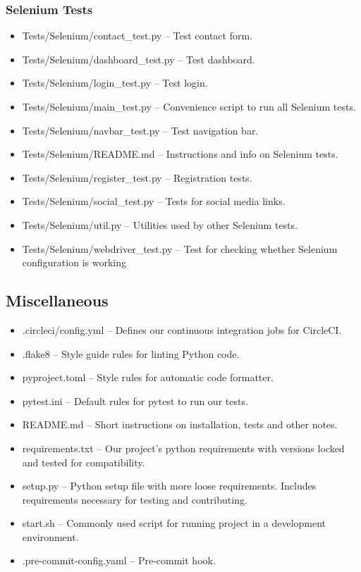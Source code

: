 \documentclass[main.tex]{subfiles}
\begin{document}
\subsubsection{Selenium Tests}\label{selenium-tests}

\begin{itemize}

\item
  Tests/Selenium/contact\_test.py -- Test contact form.
\item
  Tests/Selenium/dashboard\_test.py -- Test dashboard.
\item
  Tests/Selenium/login\_test.py -- Test login.
\item
  Tests/Selenium/main\_test.py -- Convenience script to run all Selenium tests.
\item
  Tests/Selenium/navbar\_test.py -- Test navigation bar.
\item
  Tests/Selenium/README.md -- Instructions and info on Selenium tests.
\item
  Tests/Selenium/register\_test.py -- Registration tests.
\item
  Tests/Selenium/social\_test.py -- Tests for social media links.
\item
  Tests/Selenium/util.py -- Utilities used by other Selenium tests.
\item
  Tests/Selenium/webdriver\_test.py -- Test for checking whether Selenium configuration is working
\end{itemize}

\subsection{Miscellaneous}\label{misc-files}

\begin{itemize}

\item
  .circleci/config.yml -- Defines our continuous integration jobs for CircleCI.
\item
  .flake8 -- Style guide rules for linting Python code.
\item
  pyproject.toml -- Style rules for automatic code formatter.
\item
  pytest.ini -- Default rules for pytest to run our tests.
\item
  README.md -- Short instructions on installation, tests and other notes.
\item
  requirements.txt -- Our project's python requirements with versions locked and tested for compatibility.
\item
  setup.py -- Python setup file with more loose requirements. Includes requirements necessary for testing and contributing.
\item
  start.sh -- Commonly used script for running project in a development environment.
\item
  .pre-commit-config.yaml -- Pre-commit hook.
\end{itemize}
\end{document}
